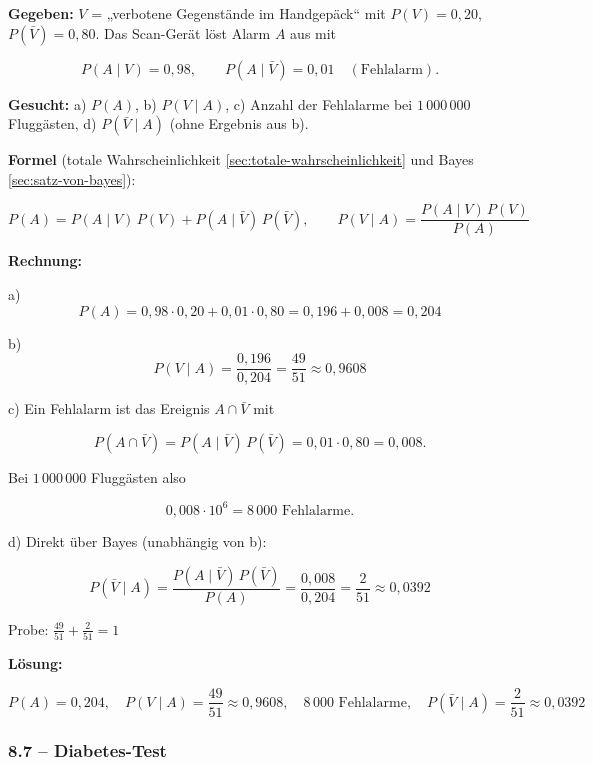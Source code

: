 \begin{beispiel}

\textbf{Gegeben:} $V$ = „verbotene Gegenstände im Handgepäck`` mit
$P(V) = 0{,}20$, $P(\bar V) = 0{,}80$. Das Scan-Gerät löst Alarm $A$ aus mit

$$
P(A \mid V) = 0{,}98, \qquad P(A \mid \bar V) = 0{,}01 \quad (\text{Fehlalarm}).
$$

\textbf{Gesucht:} a) $P(A)$, b) $P(V \mid A)$, c) Anzahl der Fehlalarme bei
$1\,000\,000$ Fluggästen, d) $P(\bar V \mid A)$ (ohne Ergebnis aus b).

\textbf{Formel} (totale Wahrscheinlichkeit \ref{sec:totale-wahrscheinlichkeit}
und Bayes \ref{sec:satz-von-bayes}):

$$
P(A) = P(A \mid V)\,P(V) + P(A \mid \bar V)\,P(\bar V), \qquad
P(V \mid A) = \frac{P(A \mid V)\,P(V)}{P(A)}
$$

\textbf{Rechnung:}

a)
$$
P(A) = 0{,}98 \cdot 0{,}20 + 0{,}01 \cdot 0{,}80 = 0{,}196 + 0{,}008 = 0{,}204
$$

b)
$$
P(V \mid A) = \frac{0{,}196}{0{,}204} = \frac{49}{51} \approx 0{,}9608
$$

c) Ein Fehlalarm ist das Ereignis $A \cap \bar V$ mit

$$
P(A \cap \bar V) = P(A \mid \bar V)\,P(\bar V) = 0{,}01 \cdot 0{,}80 = 0{,}008 .
$$

Bei $1\,000\,000$ Fluggästen also

$$
0{,}008 \cdot 10^{6} = 8\,000 \text{ Fehlalarme}.
$$

d) Direkt über Bayes (unabhängig von b):

$$
P(\bar V \mid A) = \frac{P(A \mid \bar V)\,P(\bar V)}{P(A)}
                 = \frac{0{,}008}{0{,}204} = \frac{2}{51} \approx 0{,}0392
$$

Probe: $\tfrac{49}{51} + \tfrac{2}{51} = 1$ \checkmark

\textbf{Lösung:}

$$
\boxed{P(A) = 0{,}204, \quad P(V \mid A) = \frac{49}{51} \approx 0{,}9608, \quad
8\,000 \text{ Fehlalarme}, \quad P(\bar V \mid A) = \frac{2}{51} \approx 0{,}0392}
$$

\end{beispiel}

\subsubsection*{8.7 – Diabetes-Test}

